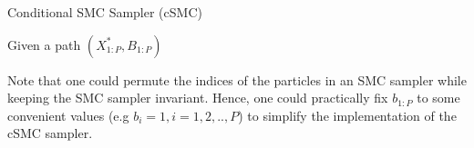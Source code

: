 \documentclass[12pt,a4paper]{article}
\begin{document}
\begin{algorithm}[htb!]
    \caption{Conditional SMC Sampler (cSMC)}\label{Alg:CSMC}
    Given a path $\left(X_{1:P}^{*},B_{1:P}\right)$\;
    
\end{algorithm}

Note that one could permute the indices of the particles in an SMC sampler while keeping the SMC sampler invariant. Hence, one could practically fix \(b_{1:P}\) to some convenient values (e.g \(b_i=1, i=1,2,..,P\)) to simplify the implementation of the cSMC sampler. 
\end{document}

